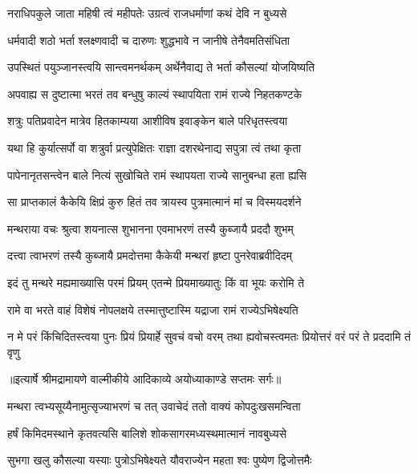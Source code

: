 \twolineshloka
{नराधिपकुले जाता महिषी त्वं महीपतेः}
{उग्रत्वं राजधर्माणां कथं देवि न बुध्यसे} %

\twolineshloka
{धर्मवादी शठो भर्ता श्लक्ष्णवादी च दारुणः}
{शुद्धभावे न जानीषे तेनैवमतिसंधिता} %

\twolineshloka
{उपस्थितं पयुञ्जानस्त्वयि सान्त्वमनर्थकम्}
{अर्थेनैवाद्य ते भर्ता कौसल्यां योजयिष्यति} %

\twolineshloka
{अपवाह्य स दुष्टात्मा भरतं तव बन्धुषु}
{काल्यं स्थापयिता रामं राज्ये निहतकण्टके} %

\twolineshloka
{शत्रुः पतिप्रवादेन मात्रेव हितकाम्यया}
{आशीविष इवाङ्केन बाले परिधृतस्त्वया} %

\twolineshloka
{यथा हि कुर्यात्सर्पो वा शत्रुर्वा प्रत्युपेक्षितः}
{राज्ञा दशरथेनाद्य सपुत्रा त्वं तथा कृता} %

\twolineshloka
{पापेनानृतसन्त्वेन बाले नित्यं सुखोचिते}
{रामं स्थापयता राज्ये सानुबन्धा हता ह्यसि} %

\twolineshloka
{सा प्राप्तकालं कैकेयि क्षिप्रं कुरु हितं तव}
{त्रायस्व पुत्रमात्मानं मां च विस्मयदर्शने} %

\twolineshloka
{मन्थराया वचः श्रुत्वा शयनात्स शुभानना}
{एवमाभरणं तस्यै कुब्जायै प्रददौ शुभम्} %

\twolineshloka
{दत्त्वा त्वाभरणं तस्यै कुब्जायै प्रमदोत्तमा}
{कैकेयी मन्थरां हृष्टा पुनरेवाब्रवीदिदम्} %

\twolineshloka
{इदं तु मन्थरे मह्यमाख्यासि परमं प्रियम्}
{एतन्मे प्रियमाख्यातुः किं वा भूयः करोमि ते} %

\twolineshloka
{रामे वा भरते वाहं विशेषं नोपलक्षये}
{तस्मात्तुष्टास्मि यद्राजा रामं राज्येऽभिषेक्ष्यति} %

\fourlineindentedshloka
{न मे परं किंचिदितस्त्वया पुनः}
{ प्रियं प्रियार्हे सुवचं वचो वरम्}
{तथा ह्यवोचस्त्वमतः प्रियोत्तरं}
{ वरं परं ते प्रददामि तं वृणु} %


{॥इत्यार्षे श्रीमद्रामायणे वाल्मीकीये आदिकाव्ये अयोध्याकाण्डे सप्तमः सर्गः॥}


\twolineshloka
{मन्थरा त्वभ्यसूय्यैनामुत्सृज्याभरणं च तत्}
{उवाचेदं ततो वाक्यं कोपदुःखसमन्विता} %

\twolineshloka
{हर्षं किमिदमस्थाने कृतवत्यसि बालिशे}
{शोकसागरमध्यस्थमात्मानं नावबुध्यसे} %

\twolineshloka
{सुभगा खलु कौसल्या यस्याः पुत्रोऽभिषेक्ष्यते}
{यौवराज्येन महता श्वः पुष्येण द्विजोत्तमैः} %

